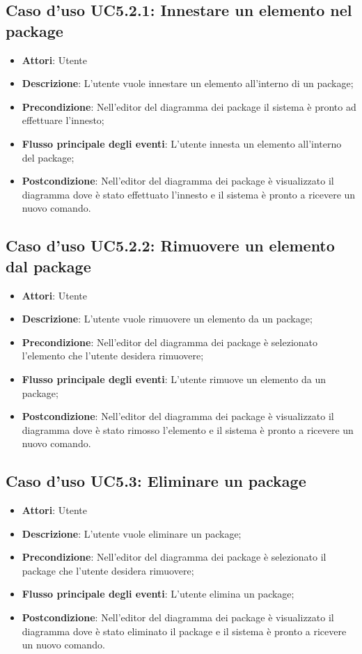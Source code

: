 \documentclass[../AnalisiDeiRequisiti.tex]{subfiles}
\begin{document}
			\subsection{Caso d'uso UC5.2.1: Innestare un elemento nel package}
			\begin{itemize}
				\item \textbf{Attori}: Utente
				\item \textbf{Descrizione}: L'utente vuole innestare un elemento all'interno di un package;
				\item \textbf{Precondizione}: Nell'editor del diagramma dei package il sistema è pronto ad effettuare l'innesto;
				\item \textbf{Flusso principale degli eventi}: L'utente innesta un elemento all'interno del package;
				\item \textbf{Postcondizione}: Nell'editor del diagramma dei package è visualizzato il diagramma dove è stato effettuato l'innesto e il sistema è pronto a ricevere un nuovo comando.
			\end{itemize}
			\subsection{Caso d'uso UC5.2.2: Rimuovere un elemento dal package}
			\begin{itemize}
				\item \textbf{Attori}: Utente
				\item \textbf{Descrizione}: L'utente vuole rimuovere un elemento da un package;
				\item \textbf{Precondizione}: Nell'editor del diagramma dei package è selezionato l'elemento che l'utente desidera rimuovere;
				\item \textbf{Flusso principale degli eventi}: L'utente rimuove un elemento da un package;
				\item \textbf{Postcondizione}: Nell'editor del diagramma dei package è visualizzato il diagramma dove è stato rimosso l'elemento e il sistema è pronto a ricevere un nuovo comando.
			\end{itemize}
			\subsection{Caso d'uso UC5.3: Eliminare un package}
			\begin{itemize}
				\item \textbf{Attori}: Utente
				\item \textbf{Descrizione}: L'utente vuole eliminare un package;
				\item \textbf{Precondizione}: Nell'editor del diagramma dei package è selezionato il package che l'utente desidera rimuovere;
				\item \textbf{Flusso principale degli eventi}: L'utente elimina un package;
				\item \textbf{Postcondizione}: Nell'editor del diagramma dei package è visualizzato il diagramma dove è stato eliminato il package e il sistema è pronto a ricevere un nuovo comando.
			\end{itemize}
\end{document}
